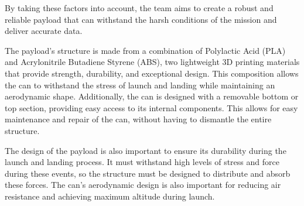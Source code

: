 By taking these factors into account, the team aims to create a robust and reliable payload that can withstand the harsh conditions of the mission and deliver accurate data.

The payload's structure is made from a combination of Polylactic Acid (PLA) and Acrylonitrile Butadiene Styrene (ABS), two lightweight 3D printing materials that provide strength, durability, and exceptional design. This composition allows the can to withstand the stress of launch and landing while maintaining an aerodynamic shape. Additionally, the can is designed with a removable bottom or top section, providing easy access to its internal components. This allows for easy maintenance and repair of the can, without having to dismantle the entire structure.


The design of the payload is also important to ensure its durability during the launch and landing process. It must withstand high levels of stress and force during these events, so the structure must be designed to distribute and absorb these forces. The can's aerodynamic design is also important for reducing air resistance and achieving maximum altitude during launch.


